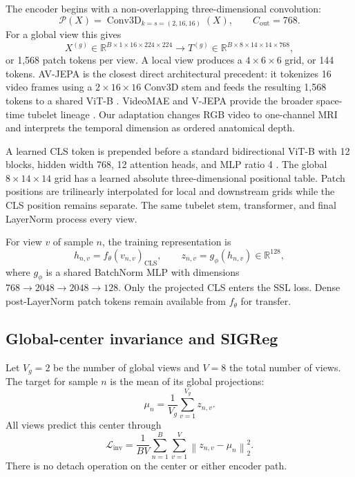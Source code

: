 \documentclass[10pt]{article}
\newcommand{\R}{\mathbb{R}}
\begin{document}
The encoder begins with a non-overlapping three-dimensional convolution:
\begin{equation}
  \mathcal{P}(X)=\operatorname{Conv3D}_{k=s=(2,16,16)}(X),
  \qquad C_{\mathrm{out}}=768.
\end{equation}
For a global view this gives
\begin{equation}
  X^{(g)}\in\R^{B\times1\times16\times224\times224}
  \longrightarrow
  T^{(g)}\in\R^{B\times8\times14\times14\times768},
\end{equation}
or 1,568 patch tokens per view. A local view produces a
$4\times6\times6$ grid, or 144 tokens. AV-JEPA is the closest direct
architectural precedent: it tokenizes 16 video frames using a
$2\times16\times16$ Conv3D stem and feeds the resulting 1,568 tokens to a
shared ViT-B \cite{avjepa}. VideoMAE and V-JEPA provide the broader
space-time tubelet lineage \cite{videomae,vjepa}. Our adaptation changes RGB
video to one-channel MRI and interprets the temporal dimension as ordered
anatomical depth.

A learned CLS token is prepended before a standard bidirectional ViT-B with 12
blocks, hidden width 768, 12 attention heads, and MLP ratio 4
\cite{vit}. The global $8\times14\times14$ grid has a learned absolute
three-dimensional positional table. Patch positions are trilinearly
interpolated for local and downstream grids while the CLS position remains
separate. The same tubelet stem, transformer, and final LayerNorm process every
view.

For view $v$ of sample $n$, the training representation is
\begin{equation}
  h_{n,v}=f_{\theta}(v_{n,v})_{\mathrm{CLS}},\qquad
  z_{n,v}=g_{\phi}(h_{n,v})\in\R^{128},
\end{equation}
where $g_{\phi}$ is a shared BatchNorm MLP with dimensions
$768\rightarrow2048\rightarrow2048\rightarrow128$. Only the projected CLS
enters the SSL loss. Dense post-LayerNorm patch tokens remain available from
$f_{\theta}$ for transfer.

\subsection{Global-center invariance and SIGReg}

Let $V_g=2$ be the number of global views and $V=8$ the total number of views.
The target for sample $n$ is the mean of its global projections:
\begin{equation}
  \mu_n=\frac{1}{V_g}\sum_{v=1}^{V_g}z_{n,v}.
\end{equation}
All views predict this center through
\begin{equation}
  \mathcal{L}_{\mathrm{inv}}
  =\frac{1}{BV}\sum_{n=1}^{B}\sum_{v=1}^{V}
   \left\|z_{n,v}-\mu_n\right\|_2^2.
\end{equation}
There is no detach operation on the center or either encoder path.
\end{document}
